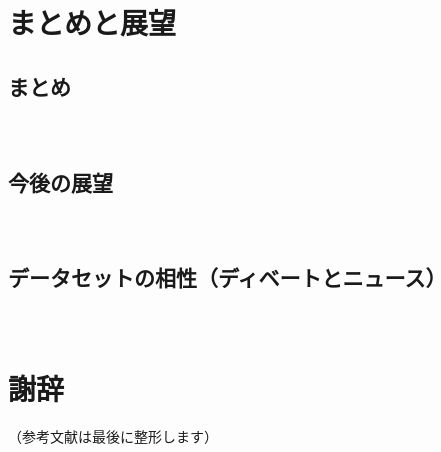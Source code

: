 \documentclass[12pt,a4j]{jreport}
\begin{document}
\chapter{まとめと展望}


\section{まとめ}
~

\section{今後の展望}
~%
 \section{データセットの相性（ディベートとニュース）}
~

\chapter*{謝辞}

（参考文献は最後に整形します）



\end{document}
